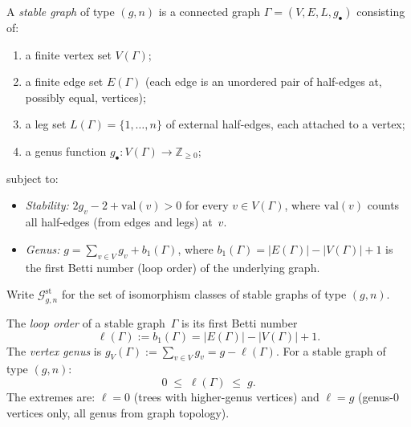 \begin{definition}\label{def:stable-graph-hg}
A \emph{stable graph} of type $(g,n)$ is a connected graph
$\Gamma = (V, E, L, g_\bullet)$ consisting of:
\begin{enumerate}[label=\textup{(\roman*)}]
\item a finite vertex set $V(\Gamma)$;
\item a finite edge set $E(\Gamma)$ (each edge is an unordered pair of
 half-edges at, possibly equal, vertices);
\item a leg set $L(\Gamma) = \{1, \ldots, n\}$ of external
 half-edges, each attached to a vertex;
\item a genus function $g_\bullet\colon V(\Gamma) \to \mathbb{Z}_{\geq 0}$;
\end{enumerate}
subject to:
\begin{itemize}
\item \emph{Stability:} $2g_v - 2 + \mathrm{val}(v) > 0$ for every
 $v \in V(\Gamma)$, where $\mathrm{val}(v)$ counts all half-edges
 (from edges and legs) at~$v$.
\item \emph{Genus:} $g = \sum_{v \in V} g_v + b_1(\Gamma)$, where
 $b_1(\Gamma) = |E(\Gamma)| - |V(\Gamma)| + 1$ is the first Betti
 number (loop order) of the underlying graph.
\end{itemize}
Write $\mathcal{G}_{g,n}^{\mathrm{st}}$ for the set of isomorphism
classes of stable graphs of type $(g,n)$.
\end{definition}

\begin{definition}\label{def:loop-order}
The \emph{loop order} of a stable graph~$\Gamma$ is its first Betti
number
\begin{equation}\label{eq:loop-order}
\ell(\Gamma) := b_1(\Gamma)
= |E(\Gamma)| - |V(\Gamma)| + 1.
\end{equation}
The \emph{vertex genus} is
$g_V(\Gamma) := \sum_{v \in V} g_v = g - \ell(\Gamma)$.
For a stable graph of type $(g,n)$:
\begin{equation}\label{eq:loop-order-range}
0 \;\leq\; \ell(\Gamma) \;\leq\; g.
\end{equation}
The extremes are:
$\ell = 0$ (trees with higher-genus vertices) and
$\ell = g$ (genus-$0$ vertices only, all genus from graph topology).
\end{definition}

